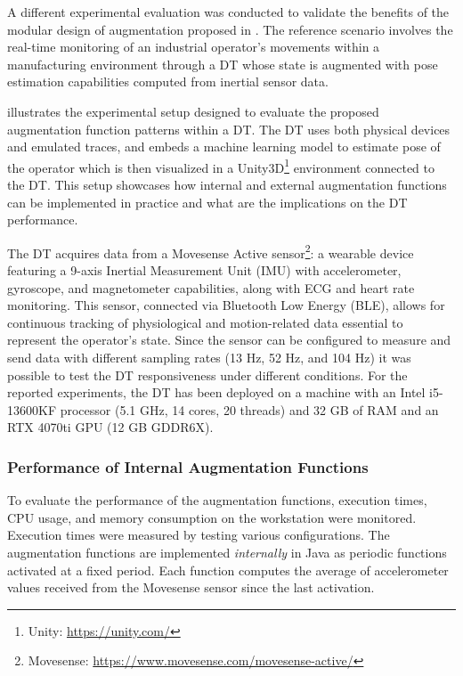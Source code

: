 A different experimental evaluation was conducted to validate the benefits of the modular design of augmentation proposed in .
%
The reference scenario involves the real-time monitoring of an industrial operator's movements within a manufacturing environment through a \ac{DT} whose state is augmented with pose estimation capabilities computed from inertial sensor data.

 illustrates the experimental setup designed to evaluate the proposed augmentation function patterns within a \ac{DT}.
%
The \ac{DT} uses both physical devices and emulated traces, and embeds a machine learning model to estimate pose of the operator which is then visualized in a Unity3D\footnote{Unity: \url{https://unity.com/}} environment connected to the \ac{DT}.
%
This setup showcases how internal and external augmentation functions can be implemented in practice and what are the implications on the \ac{DT} performance.

The \ac{DT} acquires data from a Movesense Active sensor\footnote{Movesense: \url{https://www.movesense.com/movesense-active/}}: a wearable device featuring a 9-axis Inertial Measurement Unit (IMU) with accelerometer, gyroscope, and magnetometer capabilities, along with ECG and heart rate monitoring. This sensor, connected via Bluetooth Low Energy (BLE), allows for continuous tracking of physiological and motion-related data essential to represent the operator's state. Since the sensor can be configured to measure and send data with different sampling rates (13 Hz, 52 Hz, and 104 Hz) it was possible to test the \ac{DT} responsiveness under different conditions. 
%
For the reported experiments, the \ac{DT} has been deployed on a machine with an Intel i5-13600KF processor (5.1 GHz, 14 cores, 20 threads) and 32 GB of RAM and an RTX 4070ti GPU (12 GB GDDR6X).

\subsubsection{Performance of Internal Augmentation Functions}

To evaluate the performance of the augmentation functions, execution times, CPU usage, and memory consumption on the workstation were monitored.
%
Execution times were measured by testing various configurations.
The augmentation functions are implemented \emph{internally} in Java as periodic functions activated at a fixed period.
Each function computes the average of accelerometer values received from the Movesense sensor since the last activation.

